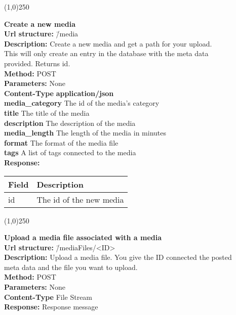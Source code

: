 \documentclass[11pt]{article}
\begin{document}
\begin{center}\line(1,0){250}\end{center}

\begin{tabbing}
\textbf{Create a new media} \\
\textcolor{black!60}{\textbf{Url structure:}} \hspace{0.2in} \= /media \\
\textcolor{black!60}{\textbf{Description:}}  \> Create a new media and get a path for your upload. \\ \> This will only create an entry in the database with the meta data \\ \> provided. Returns id. \\
\textcolor{black!60}{\textbf{Method:}} \> POST \\
\textcolor{black!60}{\textbf{Parameters:}} \> None \\
\textcolor{black!60}{\textbf{Content-Type}} \> \textbf{application/json} \\
\> \textbf{media\_category} The id of the media's category \\
\> \textbf{title} The title of the media \\
\> \textbf{description} The description of the media \\
\> \textbf{media\_length} The length of the media in minutes \\
\> \textbf{format} The format of the media file \\
\> \textbf{tags} A list of tags connected to the media \\
\textcolor{black!60}{\textbf{Response:}} \\ \>
\begin{tabular}{|l|l|}
\hline
 Field  &  Description              \\
\hline
 id     &  The id of the new media  \\
\hline
\end{tabular}
\end{tabbing}

\begin{center}\line(1,0){250}\end{center}

\begin{tabbing}
\textbf{Upload a media file associated with a media} \\
\textcolor{black!60}{\textbf{Url structure:}} \hspace{0.2in} \= /mediaFiles/<ID> \\
\textcolor{black!60}{\textbf{Description:}}  \> Upload a media file. You give the ID connected the posted \\ \> meta data and the file you want to upload. \\
\textcolor{black!60}{\textbf{Method:}} \> POST \\
\textcolor{black!60}{\textbf{Parameters:}} \> None \\
\textcolor{black!60}{\textbf{Content-Type}} \> File Stream \\
\textcolor{black!60}{\textbf{Response:}} \> Response message
\end{tabbing}
\end{document}
